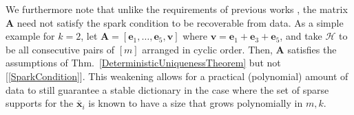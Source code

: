 \documentclass[9pt,twocolumn]{pnas-new}
\renewcommand{\eqref}[1]{\textnormal{[\ref{#1}]}}
\begin{document}




We furthermore note that unlike the requirements of previous works \cite{li2004analysis, Georgiev05, Aharon06, Hillar15}, the matrix $\mathbf{A}$ need not satisfy the spark condition to be recoverable from data. As a simple example for $k=2$, let $\mathbf{A} = [ \mathbf{e}_1, \ldots, \mathbf{e}_5, \mathbf{v}]$ where $\mathbf{v} = \mathbf{e}_1 + \mathbf{e}_3 + \mathbf{e}_5$, and take $\mathcal{H}$ to be all consecutive pairs of $[m]$ arranged in cyclic order. Then, $\mathbf{A}$ satisfies the assumptions of Thm.~\ref{DeterministicUniquenessTheorem} but not \eqref{SparkCondition}. %
This weakening allows for a practical (polynomial) amount of data to still guarantee a stable dictionary in the case where the set of sparse supports for the $\mathbf{\bar x}_i$ is known to have a size that grows polynomially in $m, k$.
\end{document}

